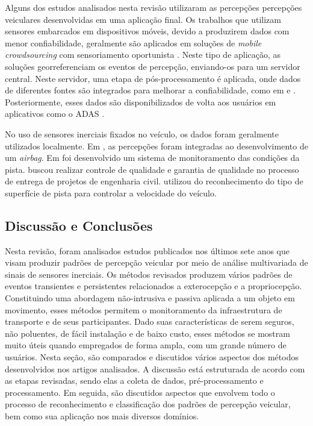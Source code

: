 Alguns dos estudos analisados nesta revisão utilizaram as percepções percepções veiculares desenvolvidas em uma aplicação final. Os trabalhos que utilizam sensores embarcados em dispositivos móveis, devido a produzirem dados com menor confiabilidade, geralmente são aplicados em soluções de \textit{mobile crowdsourcing} com sensoriamento oportunista \cite{Afrin2015,Ghadge2015,Kaur2017,Kumar2017,Li2018,Lima2016,Pooja2017,Rishiwal2016,Savera2016,Singh2017, Strutu2013,Vittorio2014}. Neste tipo de aplicação, as soluções georreferenciam os eventos de percepção, enviando-os para um servidor central. Neste servidor, uma etapa de pós-processamento é aplicada, onde dados de diferentes fontes são integrados para melhorar a confiabilidade, como em \cite{Gawad2016} e \cite{Pooja2017}. Posteriormente, esses dados são disponibilizados de volta aos usuários em aplicativos como o ADAS \cite{Afrin2015,Akhtar2014,Nalavde2015}.

No uso de sensores inerciais fixados no veículo, os dados foram geralmente utilizados localmente. Em \cite{Selmanaj2014}, as percepções foram integradas ao desenvolvimento de um \textit{airbag}. Em \cite{Tomiyama2016} foi desenvolvido um sistema de monitoramento das condições da pista. \cite{Pitonak2016} buscou realizar controle de qualidade e garantia de qualidade no processo de entrega de projetos de engenharia civil. \cite{Khaleghian2017} utilizou do reconhecimento do tipo de superfície de pista para controlar a velocidade do veículo.

\subsection{Discussão e Conclusões}

Nesta revisão, foram analisados estudos publicados nos últimos sete anos que visam produzir padrões de percepção veicular por meio de análise multivariada de sinais de sensores inerciais. Os métodos revisados produzem vários padrões de eventos transientes e persistentes relacionados a exterocepção e a propriocepção. Constituindo uma abordagem não-intrusiva e passiva aplicada a um objeto em movimento, esses métodos permitem o monitoramento da infraestrutura de transporte e de seus participantes. Dado suas características de serem seguros, não poluentes, de fácil instalação e de baixo custo, esses métodos se mostram muito úteis quando empregados de forma ampla, com um grande número de usuários. Nesta seção, são comparados e discutidos vários aspectos dos métodos desenvolvidos nos artigos analisados. A discussão está estruturada de acordo com as etapas revisadas, sendo elas a coleta de dados, pré-processamento e processamento. Em seguida, são discutidos aspectos que envolvem todo o processo de reconhecimento e classificação dos padrões de percepção veicular, bem como sua aplicação nos mais diversos domínios.

